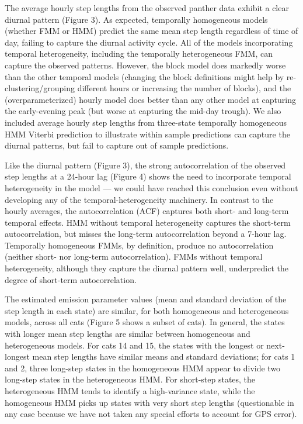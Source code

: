 \documentclass{bmcart}
\begin{document}
The average hourly step lengths from the observed panther data exhibit
a clear diurnal pattern (Figure 3). As expected, temporally
homogeneous models (whether FMM or HMM) predict the same mean step
length regardless of time of day, failing to capture the diurnal
activity cycle. All of the models incorporating temporal
heterogeneity, including the temporally heterogeneous FMM, can capture
the observed patterns. However, the block model does markedly worse
than the other temporal models (changing the block definitions might
help by re-clustering/grouping different hours or increasing the
number of blocks), and the (overparameterized) hourly model does
better than any other model at capturing the early-evening peak (but
worse at capturing the mid-day trough). We also included average
hourly step lengths from three-state temporally homogeneous HMM
Viterbi prediction to illustrate within sample predictions can capture
the diurnal patterns, but fail to capture out of sample predictions.

Like the diurnal pattern (Figure 3),
the strong autocorrelation of the observed step lengths at a 24-hour lag (Figure 4) shows the need to incorporate temporal heterogeneity in the model --- we could have reached this conclusion even without developing any of the temporal-heterogeneity machinery.
In contrast to the hourly averages, the autocorrelation (ACF) captures both short- and long-term temporal effects. HMM without temporal heterogeneity captures the short-term autocorrelation, but misses the long-term autocorrelation beyond a 7-hour lag.
Temporally homogeneous FMMs, by definition, produce no autocorrelation (neither short- nor long-term autocorrelation). FMMs without temporal heterogeneity, although they capture the diurnal pattern well, underpredict the degree of short-term autocorrelation.

The estimated emission parameter values
(mean and standard deviation of the step length in each state)
are similar, for both homogeneous and heterogeneous
models, across all cats (Figure 5 shows a subset of cats). 
In general, the states with longer mean step lengths are
similar between homogeneous and heterogeneous models. For cats 14 and 15, the states with
the longest or next-longest mean step lengths have similar means
and standard deviations; for cats 1 and 2, three long-step states
in the homogeneous HMM appear to divide two long-step states in 
the heterogeneous HMM. For short-step states, the heterogeneous HMM
tends to identify a high-variance state, while the homogeneous HMM
picks up states with very short step lengths (questionable in any
case because we have not taken any special efforts to account for
GPS error).
\end{document}
